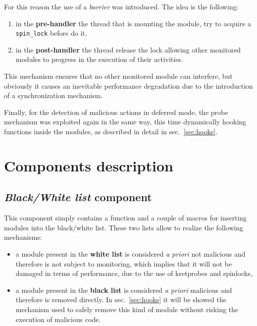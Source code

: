 \documentclass{article}
\begin{document}
	For this reason the use of a \textit{barrier} was introduced. The idea is the following:
	\begin{enumerate}
		\item in the \textbf{pre-handler} the thread that is mounting the module, try to acquire a \texttt{spin\_lock}
		before do it,
		\item in the \textbf{post-handler} the thread release the lock allowing other monitored modules to progress in
		the execution of their activities.
	\end{enumerate}

	This mechanism ensures that no other monitored module can interfere, but obviously it causes an inevitable performance degradation due to the introduction of a synchronization mechanism.

	Finally, for the detection of malicious actions in deferred mode, the probe mechanism was exploited again in the
	same way, this time dynamically hooking functions inside the modules, as described in detail in
	sec.~\ref{sec:hooks}.

	\section{Components description}

	\subsection{\emph{Black/White list} component}\label{sec:bwlist}
	This component simply contains a function and a couple of macros for inserting modules into the black/white list.
	These two lists allow to realize the following mechanisms:
	\begin{itemize}
		\item a module present in the \textbf{white list} is considered \textit{a priori} not malicious and therefore
		is not subject to monitoring, which implies that it will not be damaged in terms of performance, due to the use
		of kretprobes and spinlocks,
		\item a module present in the \textbf{black list} is considered \textit{a priori} malicious and therefore is
		removed directly. In sec.~\ref{sec:hooks} it will be showed the mechanism used to safely remove this kind of
		module without risking the execution of malicious code.
	\end{itemize}
\end{document}

